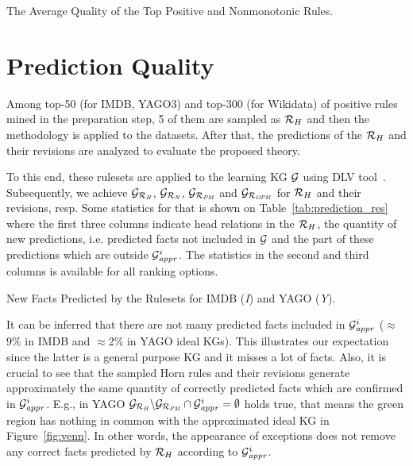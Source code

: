 \begin{table}[ht]
\centering
\footnotesize
\renewcommand*{\arraystretch}{1.07}
\centering

\smallskip
\caption{The Average Quality of the Top Positive and Nonmonotonic Rules.}
\label{tab:rules_quality}
\end{table}

\section{Prediction Quality}

Among top-50 (for IMDB, YAGO3) and top-300 (for Wikidata) of positive rules mined in the preparation step, 5 of them are sampled as $\mathcal{R}_H$ and then the methodology is applied to the datasets. After that, the predictions of the $\mathcal{R}_H$ and their revisions are analyzed to evaluate the proposed theory.

To this end, these rulesets are applied to the learning KG $\mathcal{G}$ using DLV tool~\cite{dlv}. Subsequently, we achieve $\mathcal{G}_{\mathcal{R}_{\mathit{H}}}$, $\mathcal{G}_{\mathcal{R}_{\mathit{N}}}$, $\mathcal{G}_{\mathcal{R}_{\mathit{PM}}}$ and $\mathcal{G}_{\mathcal{R}_{\mathit{OPM}}}$ for $\mathcal{R}_H$ and their revisions, resp. Some statistics for that is shown on Table~\ref{tab:prediction_res} where the first three columns indicate head relations in the $\mathcal{R}_H$, the
quantity of new predictions, i.e. predicted facts not included in $\mathcal{G}$ and the part of these predictions which are outside $\mathcal{G}^i_{\mathit{appr}}$. The statistics in the second and third columns is available for all ranking options.

\begin{table}[ht]
\centering

\smallskip
\caption{New Facts Predicted by the Rulesets for IMDB (\textit{I}) and YAGO (\textit{Y}).}
\label{tab:prediction_res}
\end{table}

It can be inferred that there are not many predicted facts included in $\mathcal{G}^i_{\mathit{appr}}$ ($\approx$9\% in IMDB and $\approx$2\% in YAGO ideal KGs). This illustrates our expectation since the latter is a general purpose KG and it misses a lot of facts. Also, it is crucial to see that the sampled Horn rules and their revisions generate approximately the same quantity of correctly predicted facts which are confirmed in $\mathcal{G}^i_{\mathit{appr}}$. E.g., in YAGO $\mathcal{G}_{\mathit{\mathcal{R}_H}}\backslash \mathcal{G}_{\mathit{\mathcal{R}_{PM}}} \cap \mathcal{G}^i_{\mathit{appr}}=\emptyset$ holds true, that means the green region has nothing in common with the approximated ideal KG in Figure~\ref{fig:venn}. In other words, the appearance of exceptions does not remove any correct facts predicted by $\mathcal{R}_H$ according to $\mathcal{G}^i_{\mathit{appr}}$.

